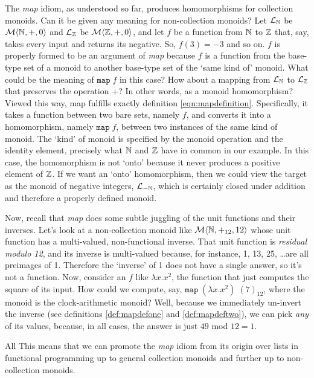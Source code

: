 The \emph{map} idiom, as understood so far, produces homomorphisms for collection monoids. Can it be given any meaning for non-collection monoids? Let $\mathcal{L}_{\mathbb{N}}$ be $\mathcal{M}\langle{\mathbb{N}},{+},{0}\rangle$ and $\mathcal{L}_{\mathbb{Z}}$ be $\mathcal{M}\langle{\mathbb{Z}},{+},{0}\rangle$, and let $f$ be a function from $\mathbb{N}$ to $\mathbb{Z}$ that, say, takes every input and returns its negative. So, $f(3)=-3$ and so on. $f$ is properly formed to be an argument of \emph{map} because $f$ is a function from the base-type set of a monoid to another base-type set of the `same kind of' monoid. What could be the meaning of $\mathtt{map}\;f$ in this case? How about a mapping from $\mathcal{L}_{\mathbb{N}}$ to $\mathcal{L}_{\mathbb{Z}}$ that preserves the operation $+$? In other words, as a monoid homomorphism? Viewed this way, map fulfills exactly definition \ref{eqn:mapdefinition}. Specifically, it takes a function between two bare sets, namely $f$, and converts it into a homomorphism, namely $\mathtt{map}\;f$, between two instances of the same kind of monoid. The `kind' of monoid is specified by the monoid operation and the identity element, precisely what $\mathbb{N}$ and $\mathbb{Z}$ have in common in our example. In this case, the homomorphism is not `onto' because it never produces a positive element of $\mathbb{Z}$. If we want an `onto' homomorphism, then we could view the target as the monoid of negative integers, $\mathcal{L}_{-\mathbb{N}}$, which is certainly closed under addition and therefore a properly defined monoid.


Now, recall that \emph{map} does some subtle juggling of the unit functions and their inverses. Let's look at a non-collection monoid like $\mathcal{M}\langle{\mathbb{N}},{+_{12}},{12}\rangle$ whose unit function has a multi-valued, non-functional inverse. That unit function is \emph{residual modulo 12}, and its inverse is multi-valued because, for instance, 1, 13, 25, \ldots are all preimages of 1. Therefore the `inverse' of 1 does not have a single answer, so it's not a function. Now, consider an $f$ like $\lambda x.x^2$, the function that just computes the square of its input. How could we compute, say, $\mathtt{map}\;(\lambda x.x^2)\;(7)_{12}$, where the monoid is the clock-arithmetic monoid? Well, because we immediately un-invert the inverse (see definitions \ref{def:mapdefone} and \ref{def:mapdeftwo}), we can pick \emph{any} of its values, because, in all cases, the answer is just $49$ mod $12=1$.


All This means that we can promote the \emph{map} idiom from its origin over lists in functional programming up to general collection monoids and further up to non-collection monoids.


